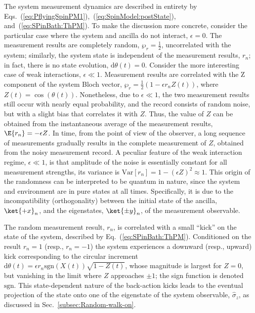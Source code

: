 The system measurement dynamics are described in entirety by Eqs.~(\ref{eq:PflyingSpinPM1}),~(\ref{eq:SpinModel:postState}),
and~(\ref{eq:SPinBath:ThPM}). To make the discussion more concrete,
consider the particular case where the system and ancilla do not interact,
$\epsilon=0$. The measurement results are completely random, $\wp_{r}=\frac{1}{2}$,
uncorrelated with the system; similarly, the system state is independent
of the measurement results, $r_{n}$; in fact, there is no state evolution,
$\mathrm{d}\theta\left(t\right)=0$. Consider the more interesting
case of weak interactions, $\epsilon\ll1$. Measurement results are
correlated with the Z component of the system Bloch vector, $\wp_{r}=\frac{1}{2}\left(1-\epsilon r_{n}Z\left(t\right)\right)$,
where $Z\left(t\right)=\cos\left(\theta\left(t\right)\right)$. Nonetheless,
 due to $\epsilon\ll1$, the two measurement results still occur with
nearly equal probability, and the record consists of random noise,
but with a slight bias that correlates it with $Z$. Thus, the value
of $Z$ can be obtained from the instantaneous average of the measurement
results, $\E{r_{n}}=-\epsilon Z$. In time, from the point of view
of the observer, a long sequence of measurements gradually results
in the complete measurement of $Z$, obtained from the noisy measurement
record. A peculiar feature of the weak interaction regime, $\epsilon\ll1$,
is that amplitude of the noise is essentially constant for all measurement
strengths, its variance is $\mathrm{Var}\left[r_{n}\right]=1-\left(\epsilon Z\right)^{2}\approx1$.
This origin of the randomness can be interpreted to be quantum in
nature, since the system and environment are in pure states at all
times. Specifically, it is due to the incompatibility (orthogonality)
between the initial state of the ancilla, $\ket{+x}_{n}$, and the
eigenstates, $\ket{\pm y}_{n}$, of the measurement observable. 

The random measurement result, $r_{n}$, is correlated with a small
``kick'' on the state of the system, described by Eq.~(\ref{eq:SPinBath:ThPM}).
Conditioned on the result $r_{n}=1$ (resp., $r_{n}=-1$) the system
experiences a downward (resp., upward) kick corresponding to the circular
increment $\mathrm{d}\theta\left(t\right)=\epsilon r_{n}\mathrm{sgn}\left(X\left(t\right)\right)\sqrt{1-Z\left(t\right)}$,
whose magnitude is largest for $Z=0$, but vanishing in the limit
where $Z$ approaches $\pm1$; the sign function is denoted $\mathrm{sgn}$.
This state-dependent nature of the back-action kicks leads to the
eventual projection of the state onto one of the eigenstate of the
system observable, $\hat{\sigma}_{z}$, as discussed in Sec.~\ref{subsec:Random-walk-on}. 

